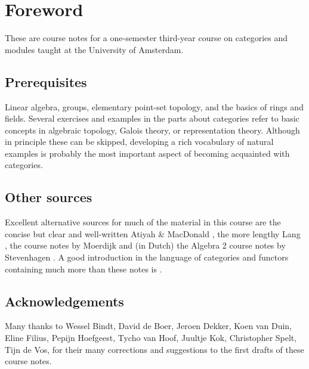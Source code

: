 
\chapter*{Foreword}

These are course notes for a one-semester third-year course on categories and modules taught at the University of Amsterdam. 

\section*{Prerequisites}

Linear algebra, groups, elementary point-set topology, and the basics of rings and fields. Several exercises and  examples in the parts about categories refer to basic concepts in algebraic topology, Galois theory, or representation theory. Although in principle these can be skipped, developing a rich vocabulary of natural  examples is probably the most important aspect of becoming acquainted with categories.


\section*{Other sources}

Excellent alternative sources for much of the material in this course are the concise but clear and well-written Atiyah \& MacDonald \cite{AtiyahMacDonald}, the more lengthy Lang \cite{Lang}, the course notes by Moerdijk \cite{Moerdijk} and (in Dutch) the Algebra 2 course notes by Stevenhagen \cite{Stevenhagen}. A good introduction in the language of categories and functors containing much more than these notes is \cite{Leinster}.


\section*{Acknowledgements}

Many thanks to  Wessel Bindt, David de Boer, Jeroen Dekker, Koen van Duin, Eline Filius, Pepijn Hoefgeest, Tycho van Hoof, Juultje Kok, Christopher Spelt, Tijn de Vos, for their many corrections and suggestions to the first drafts of these course notes. 



